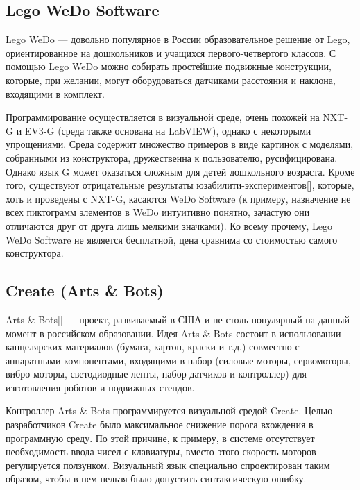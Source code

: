 \documentclass[a5paper]{article}
\begin{document}
\subsection{Lego WeDo Software}

Lego WeDo --- довольно популярное в России образовательное решение от Lego, ориентированное на дошкольников и 
учащихся первого-четвертого классов. С помощью Lego WeDo можно собирать простейшие подвижные конструкции, 
которые, при желании, могут оборудоваться датчиками расстояния и наклона, входящими в комплект.

Программирование осуществляется в визуальной среде, очень похожей на NXT-G и EV3-G (среда также основана 
на LabVIEW), однако с некоторыми упрощениями. Среда содержит множество примеров в виде картинок с моделями, 
собранными из конструктора, дружественна к пользователю, русифицирована. Однако язык G может оказаться 
сложным для детей дошкольного возраста. Кроме того, существуют отрицательные результаты юзабилити-экспериментов[], 
которые, хоть и проведены с NXT-G, касаются WeDo Software (к примеру, назначение не всех пиктограмм элементов 
в WeDo интуитивно понятно, зачастую они отличаются друг от друга лишь мелкими значками). Ко всему прочему, 
Lego WeDo Software не является бесплатной, цена сравнима со стоимостью самого конструктора.

\subsection{Create (Arts \& Bots)}

Arts \& Bots[] --- проект, развиваемый в США и не столь популярный на данный момент в российском образовании. 
Идея Arts \& Bots состоит в использовании канцелярских материалов (бумага, картон, краски и т.д.) совместно 
с аппаратными компонентами, входящими в набор (силовые моторы, сервомоторы, вибро-моторы, светодиодные ленты, 
набор датчиков и контроллер) для изготовления роботов и подвижных стендов. 

Контроллер Arts \& Bots программируется визуальной средой Create. Целью разработчиков Create было максимальное 
снижение порога вхождения в программную среду. По этой причине, к примеру, в системе отсутствует необходимость 
ввода чисел с клавиатуры, вместо этого скорость моторов регулируется ползунком. Визуальный язык специально 
спроектирован таким образом, чтобы в нем нельзя было допустить синтаксическую ошибку.
\end{document}
